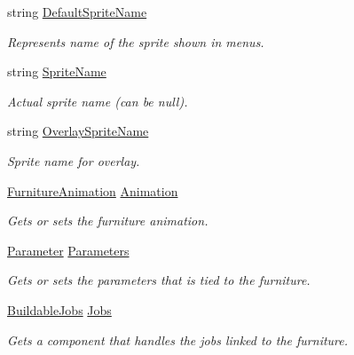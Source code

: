 \begin{DoxyCompactItemize}
string \hyperlink{class_furniture_acf7ad5c7362463b38594605407d0d189}{Default\+Sprite\+Name}
\begin{DoxyCompactList}\small\item\em Represents name of the sprite shown in menus. \end{DoxyCompactList}\item 
string \hyperlink{class_furniture_a1a600b2226d319fcd75955b222abad03}{Sprite\+Name}
\begin{DoxyCompactList}\small\item\em Actual sprite name (can be null). \end{DoxyCompactList}\item 
string \hyperlink{class_furniture_ab8181a6ce98e986e33c2c414296787a2}{Overlay\+Sprite\+Name}
\begin{DoxyCompactList}\small\item\em Sprite name for overlay. \end{DoxyCompactList}\item 
\hyperlink{class_animation_1_1_furniture_animation}{Furniture\+Animation} \hyperlink{class_furniture_a6c205a695d6f398f76df5c5c90ae170c}{Animation}
\begin{DoxyCompactList}\small\item\em Gets or sets the furniture animation. \end{DoxyCompactList}\item 
\hyperlink{class_parameter}{Parameter} \hyperlink{class_furniture_ae388e4eddbd3745a5cc7f3505b7abfca}{Parameters}
\begin{DoxyCompactList}\small\item\em Gets or sets the parameters that is tied to the furniture. \end{DoxyCompactList}\item 
\hyperlink{class_buildable_jobs}{Buildable\+Jobs} \hyperlink{class_furniture_acde3e7f9d40af5b75c441d53778a3fe2}{Jobs}
\begin{DoxyCompactList}\small\item\em Gets a component that handles the jobs linked to the furniture. \end{DoxyCompactList}\item 

\end{DoxyCompactItemize}
